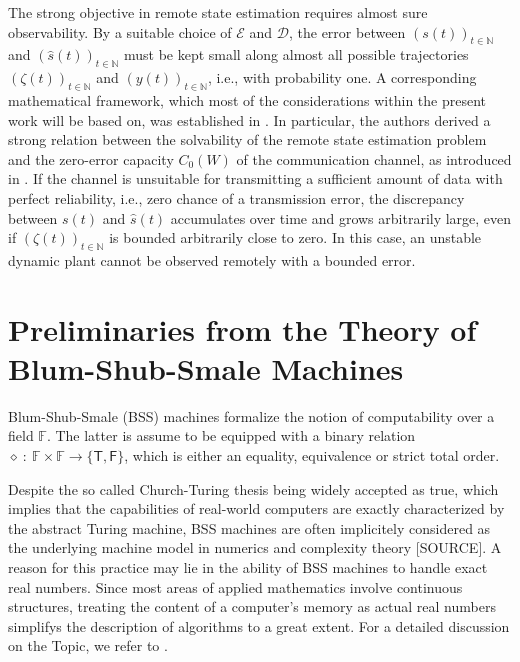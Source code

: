 \documentclass[conference]{IEEEtran}
\def\E{{\mathcal E}}
\def\D{{\mathcal D}}
\def\NN{{\mathbb N}}
\def\FF{{\mathbb F}}
\newcommand{\sdummy}{{\color{red}[SOURCE]}}
\begin{document}
	The strong objective in remote state estimation requires almost sure observability. By a suitable choice of \(\E\) and \(\D\), the error between \((s(t))_{t\in\NN}\)
	and \((\hat{s}(t))_{t\in\NN}\) must be kept small along almost all possible trajectories \((\zeta(t))_{t\in\NN}\) and \((y(t))_{t\in\NN}\), i.e., with probability one.
	A corresponding mathematical framework, which most of the considerations within the present work will be based on, was established in \cite{MS07}.
	In particular, the authors derived a strong relation between the solvability of the remote state estimation problem and the zero-error capacity \(C_0(W)\) of the 
	communication channel, as introduced in \cite{Sh56}. If the channel is unsuitable for transmitting a sufficient amount of data with perfect reliability, i.e., zero 
	chance of a transmission error, the discrepancy between \(s(t)\) and \(\hat{s}(t)\) accumulates over time and grows arbitrarily large, even if \((\zeta(t))_{t\in\NN}\) 
	is bounded arbitrarily close to zero. In this case, an unstable dynamic plant cannot be observed remotely with a bounded error. 

\section{Preliminaries from the Theory of Blum-Shub-Smale Machines}	\label{sec:PreliminariesBSS}	    	
	\noindent Blum-Shub-Smale (BSS) machines formalize the notion of computability over a field \(\FF\). The latter is assume to be equipped 
	with a binary relation \(\diamond~{:}~\FF \times \FF \rightarrow \{\mathsf{T},\mathsf{F}\}\), which is either an equality, equivalence or strict total order. 
	
	Despite the so called Church-Turing thesis being widely accepted as true, which implies that the capabilities of real-world computers are exactly characterized 
	by the abstract Turing machine, BSS machines are often implicitely considered as the underlying machine model in numerics and complexity theory \sdummy. 
	A reason for this practice may lie in the ability of BSS machines to handle exact real numbers. Since most areas of applied mathematics involve continuous structures, 
	treating the content of a computer's memory as actual real numbers simplifys the description of algorithms to a great extent. For a detailed discussion on the Topic, we refer to \cite{Bl04}.
\end{document}

